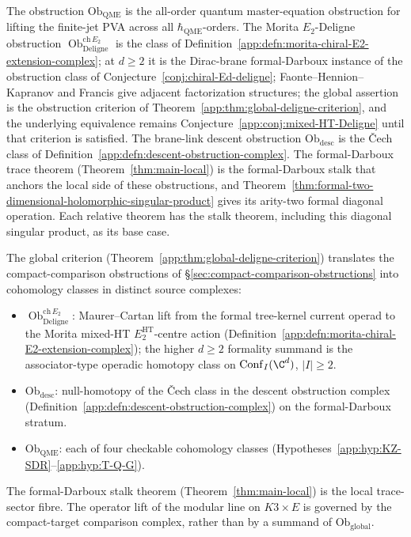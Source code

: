 \begin{rmk}\label{app:rmk:reduction-status}
The obstruction $\mathrm{Ob}_{\mathrm{QME}}$ is the all-order quantum
master-equation obstruction for lifting the finite-jet PVA across all
$\hbar_{\mathrm{QME}}$-orders.  The Morita \(E_2\)-Deligne obstruction
\(\operatorname{Ob}^{\mathrm{ch}\,E_2}_{\mathrm{Deligne}}\) is the class
of Definition~\ref{app:defn:morita-chiral-E2-extension-complex}; at
\(d\geq2\) it is the Dirac-brane formal-Darboux instance of the
obstruction class of Conjecture~\ref{conj:chiral-Ed-deligne};
  Faonte--Hennion--Kapranov
  \cite{faonte-hennion-kapranov-higher-km} and Francis
  \cite{francis-thesis} give adjacent factorization structures; the
  global assertion is the obstruction criterion of
  Theorem~\ref{app:thm:global-deligne-criterion}, and the
  underlying equivalence remains
  Conjecture~\ref{app:conj:mixed-HT-Deligne} until that criterion is
  satisfied.  The
  brane-link descent obstruction $\mathrm{Ob}_{\mathrm{desc}}$ is the
  Čech class of Definition~\ref{app:defn:descent-obstruction-complex}.
	The formal-Darboux trace theorem
	(Theorem~\ref{thm:main-local}) is the formal-Darboux stalk
that anchors the local side of these obstructions, and
Theorem~\ref{thm:formal-two-dimensional-holomorphic-singular-product} gives its
arity-two formal diagonal operation.  Each relative theorem has the
stalk theorem, including this diagonal singular product, as its base case.
\end{rmk}

\begin{constr}\label{app:constr:global-obstruction-class}
The global criterion
(Theorem~\ref{app:thm:global-deligne-criterion}) translates the
compact-comparison obstructions of
\S\ref{sec:compact-comparison-obstructions} into
cohomology classes in distinct source complexes:

\begin{itemize}
  \item
    \(\operatorname{Ob}^{\mathrm{ch}\,E_2}_{\mathrm{Deligne}}\):
    Maurer--Cartan lift from the formal tree-kernel current operad to
    the Morita mixed-HT \(E_2^{\mathrm{HT}}\)-centre action
    (Definition~\ref{app:defn:morita-chiral-E2-extension-complex}); the
    higher \(d\geq2\) formality summand is the associator-type operadic
    homotopy class on \(\mathrm{Conf}_I(\C^d)\), \(|I|\geq2\).
  \item $\mathrm{Ob}_{\mathrm{desc}}$: null-homotopy of the Čech class
    in the descent obstruction complex
    (Definition~\ref{app:defn:descent-obstruction-complex}) on the
    formal-Darboux stratum.
  \item $\mathrm{Ob}_{\mathrm{QME}}$: each of four checkable
    cohomology classes
    (Hypotheses~\ref{app:hyp:KZ-SDR}--\ref{app:hyp:T-Q-G}).
\end{itemize}

The formal-Darboux stalk theorem
(Theorem~\ref{thm:main-local}) is the local trace-sector fibre.
The operator lift of the modular line on \(K3\times E\) is governed by
the compact-target comparison complex, rather than by a summand of
\(\mathrm{Ob}_{\mathrm{global}}\).
\end{constr}
